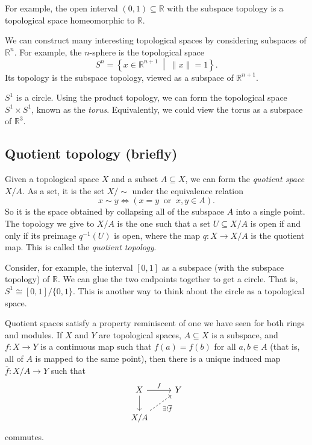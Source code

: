 \documentclass[a4paper,11pt]{article}
\begin{document}
    For example, the open interval \((0,1) \subseteq \mathbb{R}\) with the subspace topology is a topological space homeomorphic to \(\mathbb{R}\).

    We can construct many interesting topological spaces by considering subspaces of \(\mathbb{R}^n\). For example, the \(n\)-sphere is the topological space
    \[
      S^n = \left\{ x \in \mathbb{R}^{n+1} \; \middle| \; \|x\| = 1 \right\}.
    \]
    Its topology is the subspace topology, viewed as a subspace of \(\mathbb{R}^{n+1}\).

    \(S^1\) is a circle. Using the product topology, we can form the topological space \(S^1 \times S^1\), known as the \emph{torus}. Equivalently, we could view the torus as a subspace of \(\mathbb{R}^3\).
    
    \subsection{Quotient topology (briefly)}
    Given a topological space \(X\) and a subset \(A \subseteq X\), we can form the \emph{quotient space} \(X/A\). As a set, it is the set \(X/{\sim}\) under the equivalence relation
    \[
      x \sim y \iff (x = y\ \text{ or }\ x,y \in A).
    \]
    So it is the space obtained by collapsing all of the subspace \(A\) into a single point. The topology we give to \(X/A\) is the one such that a set \(U \subseteq X/A\) is open if and only if its preimage \(q^{-1}(U)\) is open, where the map \(q: X \to X/A\) is the quotient map. This is called the \emph{quotient topology}.

    Consider, for example, the interval \([0,1]\) as a subspace (with the subspace topology) of \(\mathbb{R}\). We can glue the two endpoints together to get a circle. That is, \(S^1 \cong [0,1]/\{0,1\}\). This is another way to think about the circle as a topological space.

    Quotient spaces satisfy a property reminiscent of one we have seen for both rings and modules. If \(X\) and \(Y\) are topological spaces, \(A \subseteq X\) is a subspace, and \(f: X \to Y\) is a continuous map such that \(f(a) = f(b)\) for all \(a,b \in A\) (that is, all of \(A\) is mapped to the same point), then there is a unique induced map \(\overline{f}: X/A \to Y\) such that
    \[
      \begin{tikzcd}
        X \arrow[r,"f"] \arrow[d] & Y \\
        X/A \arrow[ru,"\exists!\overline{f}"',dashed] & {}
      \end{tikzcd}
    \]
    commutes.
\end{document}
